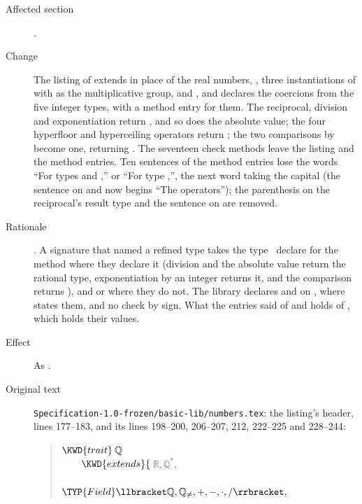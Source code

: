 \begin{description}
\item[Affected section] .
\item[Change] The listing of  extends  in place of the
real numbers, , three instantiations of  with
 as the multiplicative group,
 and , and declares the
coercions from the five integer types, with a method entry for them.
The reciprocal, division and exponentiation return , and so does
the absolute value; the four hyperfloor and hyperceiling operators return
; the two comparisons by  become one, returning
.
The seventeen check methods leave the listing and the method entries.
Ten sentences of the method entries lose the words ``For types
 and ,'' or ``For type
,'', the next word taking the capital (the sentence on
 and  now begins ``The operators''); the parenthesis on the reciprocal's result type and
the sentence on  are removed.
\item[Rationale] .
A signature that named a refined type takes the type \library\ declare for the
method where they declare it (division and the absolute value return the
rational type, exponentiation by an integer returns it, and the comparison
 returns ), and  or  where
they do not.
The library declares  and  on , where
 states them, and no check by sign.
What the entries said of  and  holds of
, which holds their values.
\item[Effect] As .
\item[Original text] \nolinkurl{Specification-1.0-frozen/basic-lib/numbers.tex}:
the listing's header, lines 177--183, and its lines 198--200, 206--207, 212,
222--225 and 228--244:
\begin{quote}
\begin{Fortress}
\(\KWD{trait}\:\mathbb{Q}\)\\
{\tt~~~~}\(    \KWD{extends} \{\, \null\)\(\mathbb{R}, \mathbb{Q}^*,\)\\
{\tt~~~~~~~~~~~~~~}\(              \TYP{Field}\llbracket\mathbb{Q},\mathbb{Q}_{\neq},+,-,\cdot,/\rrbracket,\)\\

\end{Fortress}
\end{quote}
\end{description}
